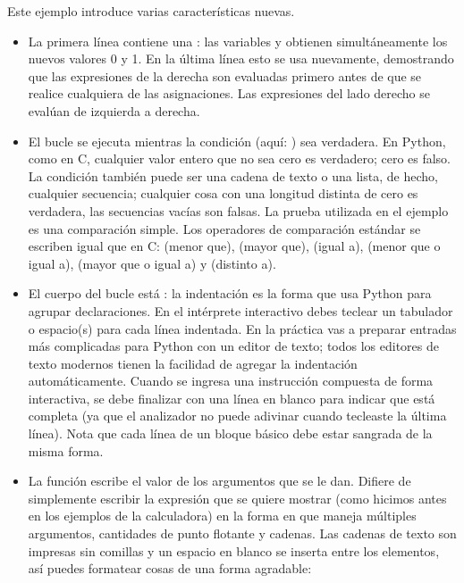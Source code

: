 \documentclass[a5paper,10pt,spanish]{sphinxmanual}
\begin{document}
\sphinxAtStartPar
Este ejemplo introduce varias características nuevas.
\begin{itemize}
\item {} 
\sphinxAtStartPar
La primera línea contiene una : las variables  y  obtienen simultáneamente los nuevos valores 0 y 1. En la última línea esto se usa nuevamente, demostrando que las expresiones de la derecha son evaluadas primero antes de que se realice cualquiera de las asignaciones. Las expresiones del lado derecho se evalúan de izquierda a derecha.

\item {} 
\sphinxAtStartPar
El bucle  se ejecuta mientras la condición (aquí: ) sea verdadera. En Python, como en C, cualquier valor entero que no sea cero es verdadero; cero es falso. La condición también puede ser una cadena de texto o una lista, de hecho, cualquier secuencia; cualquier cosa con una longitud distinta de cero es verdadera, las secuencias vacías son falsas. La prueba utilizada en el ejemplo es una comparación simple. Los operadores de comparación estándar se escriben igual que en C: \sphinxcode{\sphinxupquote{<}} (menor que), \sphinxcode{\sphinxupquote{>}} (mayor que), \sphinxcode{\sphinxupquote{==}} (igual a), \sphinxcode{\sphinxupquote{<=}} (menor que o igual a), \sphinxcode{\sphinxupquote{>=}} (mayor que o igual a) y \sphinxcode{\sphinxupquote{!=}} (distinto a).

\item {} 
\sphinxAtStartPar
El cuerpo del bucle está : la indentación es la forma que usa Python para agrupar declaraciones. En el intérprete interactivo debes teclear un tabulador o espacio(s) para cada línea indentada. En la práctica vas a preparar entradas más complicadas para Python con un editor de texto; todos los editores de texto modernos tienen la facilidad de agregar la indentación automáticamente. Cuando se ingresa una instrucción compuesta de forma interactiva, se debe finalizar con una línea en blanco para indicar que está completa (ya que el analizador no puede adivinar cuando tecleaste la última línea). Nota que cada línea de un bloque básico debe estar sangrada de la misma forma.

\item {} 
\sphinxAtStartPar
La función  escribe el valor de los argumentos que se le dan. Difiere de simplemente escribir la expresión que se quiere mostrar (como hicimos antes en los ejemplos de la calculadora) en la forma en que maneja múltiples argumentos, cantidades de punto flotante y cadenas. Las cadenas de texto son impresas sin comillas y un espacio en blanco se inserta entre los elementos, así puedes formatear cosas de una forma agradable:


\end{itemize}
\end{document}
